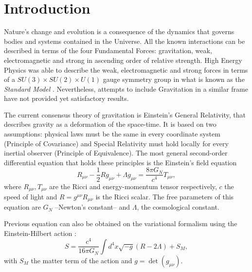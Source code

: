 \chapter{Introduction}
\label{ch:introduction}
Nature's change and evolution is a consequence of the dynamics that governs bodies and systems contained in the Universe. All the known interactions can be described in terms of the four Fundamental Forces: gravitation, weak, electromagnetic and strong in ascending order of relative strength. High Energy Physics was able to describe the weak, electromagnetic and strong forces in terms of a $SU(3)\times SU(2)\times U(1)$ gauge symmetry group in what is known as the {\it Standard Model} \cite{halzen1984quarks,peskin1995introduction,weinberg1995quantum,weinberg1996quantum,2000hep.ph....1283N}. Nevertheless, attempts to include Gravitation in a similar frame have not provided yet satisfactory results.
\newline

The current consensus theory of gravitation is Einstein's General Relativity, that describes gravity as a deformation of the space-time. It is based on two assumptions: physical laws must be the same in every coordinate system (Principle of Covariance) and Special Relativity must hold locally for every inertial observer (Principle of Equivalence). The most general second-order differential equation that holds these principles is the Einstein's field equation \cite{ANDP:ANDP19163540702,1916AnP...354..769E,1917SPAW.......142E,2001LRR.....4....1C}
\begin{equation}
R_{\mu\nu}-\frac{1}{2}Rg_{\mu\nu} + \Lambda g_{\mu\nu} = \frac{8\pi G_N}{c^4}T_{\mu\nu},
\label{eq:einsteinbare}
\end{equation}
where $R_{\mu\nu},T_{\mu\nu}$ are the Ricci and energy-momentum tensor respectively, $c$ the speed of light and $R=g^{\mu\nu}R_{\mu\nu}$ is the Ricci scalar. The free parameters of this equation are $G_N$ --Newton's constant-- and $\Lambda$, the cosmological constant.
\newline

Previous equation can also be obtained on the variational formalism using the Einstein-Hilbert action \cite{Hilbert:1915tx}:
\begin{equation}
S = \frac{c^4}{16\pi G_N}\int d^4x\sqrt{-g}(R-2\Lambda)+S_M,
\label{eq:ehaction}
\end{equation}
with $S_M$ the matter term of the action and $g=\det(g_{\mu\nu})$.

